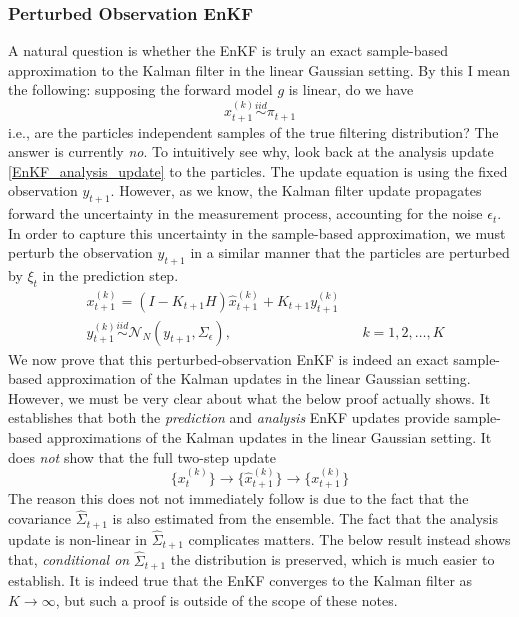 \documentclass[12pt]{article}
\begin{document}
\subsubsection{Perturbed Observation EnKF}
A natural question is whether the EnKF is truly an exact sample-based approximation to the Kalman filter in the linear Gaussian setting. By this I mean the following: 
supposing the forward model $g$ is linear, do we have 
\[x^{(k)}_{t+1} \overset{iid}{\sim} \pi_{t+1} \]
i.e., are the particles independent samples of the true filtering distribution? The answer is currently \textit{no}. To intuitively see why,  
look back at the analysis update \ref{EnKF_analysis_update} to the particles. The update equation is using the fixed observation $y_{t+1}$. However, as we know, 
the Kalman filter update propagates forward the uncertainty in the measurement process, accounting for the noise $\epsilon_t$. In order to capture this uncertainty 
in the sample-based approximation, we must perturb the observation $y_{t+1}$ in a similar manner that the particles are perturbed by $\xi_t$ in the prediction step. 
\begin{align}
&x^{(k)}_{t+1} = (I - K_{t+1}H) \hat{x}^{(k)}_{t+1} + K_{t+1} y^{(k)}_{t+1} \label{EnKF_analysis_update_perturbed_obs} \\
&y^{(k)}_{t+1} \overset{iid}{\sim} \mathcal{N}_N(y_{t+1}, \Sigma_{\epsilon}), && k = 1, 2, \dots, K \nonumber 
\end{align}
We now prove that this perturbed-observation EnKF is indeed an exact sample-based approximation of the Kalman updates in the linear Gaussian setting. However, we 
must be very clear about what the below proof actually shows. It establishes that both the \textit{prediction} and \textit{analysis} EnKF updates provide sample-based 
approximations of the Kalman updates in the linear Gaussian setting. It does \textit{not} show that the full two-step update 
\[\{x^{(k)}_t\} \to \{\hat{x}^{(k)}_{t+1}\} \to \{x^{(k)}_{t+1}\}\]
The reason this does not not immediately follow is due to the fact that the covariance $\hat{\Sigma}_{t+1}$ is also estimated from the ensemble. The fact that the 
analysis update is non-linear in $\hat{\Sigma}_{t+1}$ complicates matters. The below result instead shows that, \textit{conditional on } $\hat{\Sigma}_{t+1}$ the 
distribution is preserved, which is much easier to establish. It is indeed true that the EnKF converges to the Kalman filter as $K \to \infty$, but such a proof is outside 
of the scope of these notes. 
\end{document}
